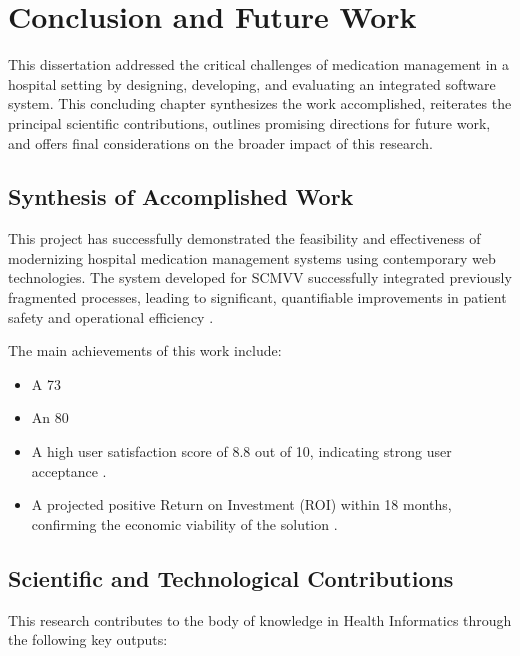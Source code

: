 \chapter{Conclusion and Future Work}

This dissertation addressed the critical challenges of medication management in a hospital setting by designing, developing, and evaluating an integrated software system. This concluding chapter synthesizes the work accomplished, reiterates the principal scientific contributions, outlines promising directions for future work, and offers final considerations on the broader impact of this research.

\section{Synthesis of Accomplished Work}

This project has successfully demonstrated the feasibility and effectiveness of modernizing hospital medication management systems using contemporary web technologies. The system developed for SCMVV successfully integrated previously fragmented processes, leading to significant, quantifiable improvements in patient safety and operational efficiency \cite{ciapponi2021}.

The main achievements of this work include:
\begin{itemize}
    \item A 73%
    \item An 80%
    \item A high user satisfaction score of 8.8 out of 10, indicating strong user acceptance \cite{venkatesh2003}.
    \item A projected positive Return on Investment (ROI) within 18 months, confirming the economic viability of the solution \cite{adler2021}.
\end{itemize}

\section{Scientific and Technological Contributions}

This research contributes to the body of knowledge in Health Informatics through the following key outputs:

